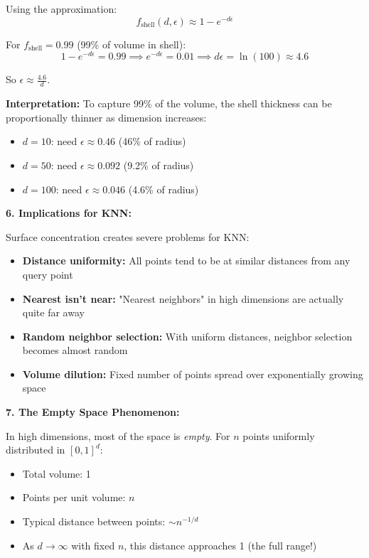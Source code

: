 \documentclass[12pt]{article}
\begin{document}
\begin{explanation}
Using the approximation:
\[
f_{\text{shell}}(d, \epsilon) \approx 1 - e^{-d\epsilon}
\]

For \(f_{\text{shell}} = 0.99\) (99\% of volume in shell):
\[
1 - e^{-d\epsilon} = 0.99 \implies e^{-d\epsilon} = 0.01 \implies d\epsilon = \ln(100) \approx 4.6
\]

So \(\epsilon \approx \frac{4.6}{d}\).

\textbf{Interpretation:} To capture 99\% of the volume, the shell thickness can be proportionally thinner as dimension increases:
\begin{itemize}
    \item \(d=10\): need \(\epsilon \approx 0.46\) (46\% of radius)
    \item \(d=50\): need \(\epsilon \approx 0.092\) (9.2\% of radius)
    \item \(d=100\): need \(\epsilon \approx 0.046\) (4.6\% of radius)
\end{itemize}

\textbf{6. Implications for KNN:}

Surface concentration creates severe problems for KNN:

\begin{itemize}
    \item \textbf{Distance uniformity:} All points tend to be at similar distances from any query point
    \item \textbf{Nearest isn't near:} "Nearest neighbors" in high dimensions are actually quite far away
    \item \textbf{Random neighbor selection:} With uniform distances, neighbor selection becomes almost random
    \item \textbf{Volume dilution:} Fixed number of points spread over exponentially growing space
\end{itemize}

\textbf{7. The Empty Space Phenomenon:}

In high dimensions, most of the space is \textit{empty}. For \(n\) points uniformly distributed in \([0,1]^d\):

\begin{itemize}
    \item Total volume: 1
    \item Points per unit volume: \(n\)
    \item Typical distance between points: \(\sim n^{-1/d}\)
    \item As \(d \to \infty\) with fixed \(n\), this distance approaches 1 (the full range!)
\end{itemize}


\end{explanation}
\end{document}
